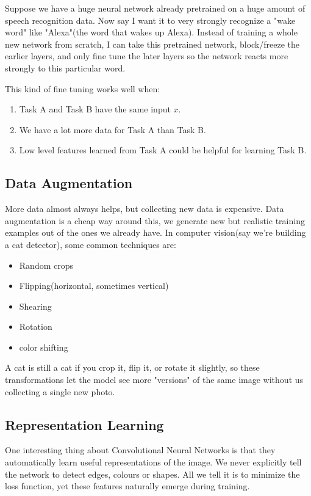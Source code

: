 \documentclass[12pt]{article}
\begin{document}
Suppose we have a huge neural network already pretrained on a huge amount of speech recognition data. Now say I want it to very strongly recognize a "wake word" like "Alexa"(the word that wakes up Alexa). Instead of training a whole new network from scratch, I can take this pretrained network, block/freeze the earlier layers, and only fine tune the later layers so the network reacts more strongly to this particular word.

This kind of fine tuning works well when:
\begin{enumerate}
    \item Task A and Task B have the same input $x$.
    \item We have a lot more data for Task A than Task B.
    \item Low level features learned from Task A could be helpful for learning Task B.
\end{enumerate}


\subsection{Data Augmentation}

More data almost always helps, but collecting new data is expensive. Data augmentation is a cheap way around this, we generate new but realistic training examples out of the ones we already have. In computer vision(say we're building a cat detector), some common techniques are:
\begin{itemize}
    \item Random crops
    \item Flipping(horizontal, sometimes vertical)
    \item Shearing
    \item Rotation
    \item color shifting
\end{itemize}
A cat is still a cat if you crop it, flip it, or rotate it slightly, so these transformations let the model see more "versions" of the same image without us collecting a single new photo.

\subsection{Representation Learning}

One interesting thing about Convolutional Neural Networks is that they automatically learn useful representations of the image. We never explicitly tell the network to detect edges, colours or shapes. All we tell it is to minimize the loss function, yet these features naturally emerge during training.
\end{document}
